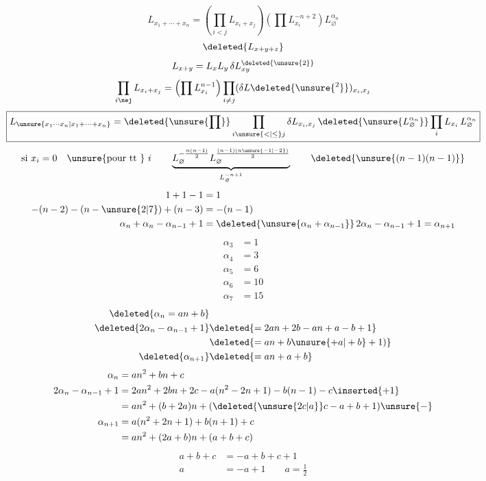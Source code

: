 \[
L_{x_1+\cdots+x_n}=\left(\prod_{i<j}L_{x_i+x_j}\right)
\left(\prod L_{x_i}^{-n+2}\right)L_{\varnothing}^{\alpha_n}
\]
\[
\deleted{L_{x+y+z}}
\]
\[
L_{x+y}=L_xL_y\,\delta L_{xy}^{\deleted{\unsure{2}}}
\]
\[
\prod_{i\nej} L_{x_i+x_j}=
\left(\prod L_{x_i}^{n-1}\right)\prod_{i\ne j}
(\delta L\deleted{\unsure{^{2}}})_{x_i,x_j}
\]
\[
\boxed{L_{\unsure{x_1\cdots x_n|x_1+\cdots+x_n}}=
\deleted{\unsure{\prod}}\prod_{i\unsure{<|\le}j}\delta L_{x_i,x_j}\,
\deleted{\unsure{L_{\varnothing}^{\alpha_n}}}\prod_i L_{x_i}\,L_{\varnothing}^{\alpha_n}}
\]
\[
\text{si }x_i=0\quad\text{\unsure{pour tt } }i\qquad
\underbrace{L_{\varnothing}^{-\frac{n(n-1)}2}
L_{\varnothing}^{\frac{(n-1)(n\unsure{-1|-2})}2}}_{L_{\varnothing}^{-n+1}}
\qquad \deleted{\unsure{(n-1)(n-1)}}
\]
\[
\begin{aligned}
1+1-1&=1\\
-(n-2)-(n-\unsure{2|7})+(n-3)&=-(n-1)\\
\alpha_n+\alpha_n-\alpha_{n-1}+1&=\deleted{\unsure{\alpha_n+\alpha_{n-1}}}\,2\alpha_n-\alpha_{n-1}+1=\alpha_{n+1}
\end{aligned}
\]
\[
\begin{aligned}
\alpha_3&=1\\ \alpha_4&=3\\ \alpha_5&=6\\ \alpha_6&=10\\ \alpha_7&=15
\end{aligned}
\]
\[
\begin{aligned}
\deleted{\alpha_n=an+b}&\\
\deleted{2\alpha_n-\alpha_{n-1}+1}&\deleted{=2an+2b-an+a-b+1}\\
&\deleted{=an+b\unsure{+a|+b}+1)}\\
\deleted{\alpha_{n+1}}&\deleted{=an+a+b}
\end{aligned}
\]
\[
\begin{aligned}
\alpha_n&=an^2+bn+c\\
2\alpha_n-\alpha_{n-1}+1&=2an^2+2bn+2c-a(n^2-2n+1)-b(n-1)-c\inserted{+1}\\
&=an^2+(b+2a)n+(\deleted{\unsure{2c|a}}c-a+b+1)\unsure{-}\\
\alpha_{n+1}&=a(n^2+2n+1)+b(n+1)+c\\
&=an^2+(2a+b)n+(a+b+c)
\end{aligned}
\]
\[
\begin{aligned}
a+b+c&=-a+b+c+1\\
a&=-a+1\qquad a=\tfrac12
\end{aligned}
\]
